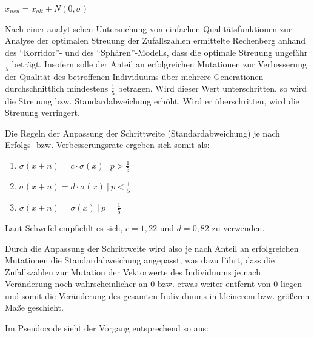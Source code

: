 $x_{neu} = x_{alt} + N(0, \sigma)$

Nach einer analytischen Untersuchung von einfachen Qualitätsfunktionen zur Analyse der optimalen Streuung der Zufallszahlen ermittelte Rechenberg anhand des \enquote{Korridor}- und des \enquote{Sphären}-Modells, dass die optimale Streuung ungefähr $\frac{1}{5}$ beträgt. Insofern solle der Anteil an erfolgreichen Mutationen zur Verbesserung der Qualität des betroffenen Individuums über mehrere Generationen durchschnittlich mindestens $\frac{1}{5}$ betragen. Wird dieser Wert unterschritten, so wird die Streuung bzw. Standardabweichung erhöht. Wird er überschritten, wird die Streuung verringert.

Die Regeln der Anpassung der Schrittweite (Standardabweichung) je nach Erfolgs- bzw. Verbesserungsrate ergeben sich somit als:
\begin{enumerate}
	\item $\sigma(x+n) = c \cdot \sigma(x)\ |\ p > \frac{1}{5}$
    \item $\sigma(x+n) = d \cdot \sigma(x)\ |\ p < \frac{1}{5}$
    \item $\sigma(x+n) = \sigma(x)\ |\ p = \frac{1}{5}$
\end{enumerate}

Laut Schwefel empfiehlt es sich, $c = 1,22$ und $d = 0,82$ zu verwenden.

Durch die Anpassung der Schrittweite wird also je nach Anteil an erfolgreichen Mutationen die Standardabweichung angepasst, was dazu führt, dass die Zufallszahlen zur Mutation der Vektorwerte des Individuums je nach Veränderung noch wahrscheinlicher an $0$ bzw. etwas weiter entfernt von $0$ liegen und somit die Veränderung des gesamten Individuums in kleinerem bzw. größeren Maße geschieht.

Im Pseudocode sieht der Vorgang entsprechend so aus:

